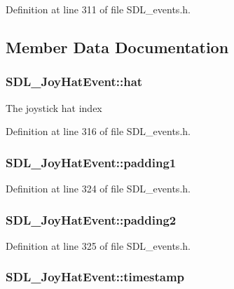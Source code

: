 Definition at line 311 of file S\-D\-L\-\_\-events.\-h.



\subsection{Member Data Documentation}
\hypertarget{struct_s_d_l___joy_hat_event_ab1b54a6d1091e583e856f86b5af1e2f6}{
\subsubsection[{hat}]{ S\-D\-L\-\_\-\-Joy\-Hat\-Event\-::hat}}\label{struct_s_d_l___joy_hat_event_ab1b54a6d1091e583e856f86b5af1e2f6}
The joystick hat index 

Definition at line 316 of file S\-D\-L\-\_\-events.\-h.

\hypertarget{struct_s_d_l___joy_hat_event_afbe72b6702cf7f70ccbe206737ab2e49}{
\subsubsection[{padding1}]{ S\-D\-L\-\_\-\-Joy\-Hat\-Event\-::padding1}}\label{struct_s_d_l___joy_hat_event_afbe72b6702cf7f70ccbe206737ab2e49}


Definition at line 324 of file S\-D\-L\-\_\-events.\-h.

\hypertarget{struct_s_d_l___joy_hat_event_adaca3e99773130ae456690ba83feb420}{
\subsubsection[{padding2}]{ S\-D\-L\-\_\-\-Joy\-Hat\-Event\-::padding2}}\label{struct_s_d_l___joy_hat_event_adaca3e99773130ae456690ba83feb420}


Definition at line 325 of file S\-D\-L\-\_\-events.\-h.

\hypertarget{struct_s_d_l___joy_hat_event_ade58ecb3e75aad4ef9809f040519a021}{
\subsubsection[{timestamp}]{ S\-D\-L\-\_\-\-Joy\-Hat\-Event\-::timestamp}}\label{struct_s_d_l___joy_hat_event_ade58ecb3e75aad4ef9809f040519a021}


